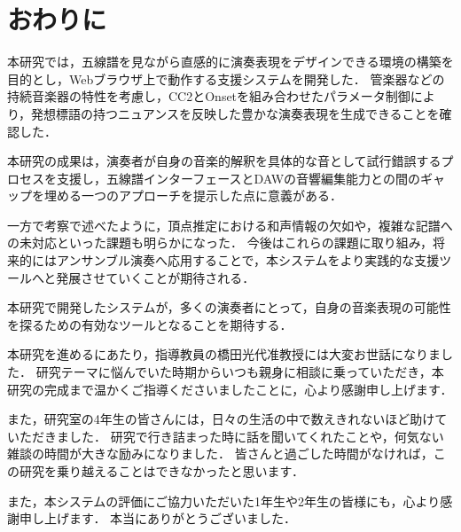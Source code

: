 \section{おわりに}
本研究では，五線譜を見ながら直感的に演奏表現をデザインできる環境の構築を目的とし，Webブラウザ上で動作する支援システムを開発した．
管楽器などの持続音楽器の特性を考慮し，CC2とOnsetを組み合わせたパラメータ制御により，発想標語の持つニュアンスを反映した豊かな演奏表現を生成できることを確認した．

本研究の成果は，演奏者が自身の音楽的解釈を具体的な音として試行錯誤するプロセスを支援し，五線譜インターフェースとDAWの音響編集能力との間のギャップを埋める一つのアプローチを提示した点に意義がある．

一方で考察で述べたように，頂点推定における和声情報の欠如や，複雑な記譜への未対応といった課題も明らかになった．
今後はこれらの課題に取り組み，将来的にはアンサンブル演奏へ応用することで，本システムをより実践的な支援ツールへと発展させていくことが期待される．

本研究で開発したシステムが，多くの演奏者にとって，自身の音楽表現の可能性を探るための有効なツールとなることを期待する．

\begin{acknowledgment}
	本研究を進めるにあたり，指導教員の橋田光代准教授には大変お世話になりました．
	研究テーマに悩んでいた時期からいつも親身に相談に乗っていただき，本研究の完成まで温かくご指導くださいましたことに，心より感謝申し上げます．

	また，研究室の4年生の皆さんには，日々の生活の中で数えきれないほど助けていただきました．
	研究で行き詰まった時に話を聞いてくれたことや，何気ない雑談の時間が大きな励みになりました．
	皆さんと過ごした時間がなければ，この研究を乗り越えることはできなかったと思います．

	また，本システムの評価にご協力いただいた1年生や2年生の皆様にも，心より感謝申し上げます．
	本当にありがとうございました．
\end{acknowledgment}
